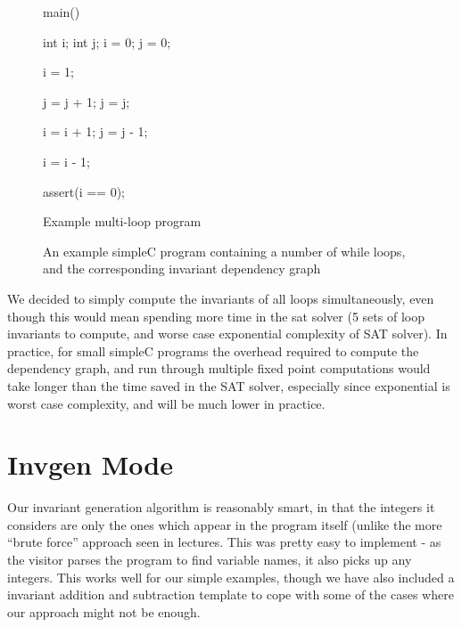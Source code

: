 \documentclass[11pt]{article}
\begin{document}
\begin{figure}[H]
\begin{center}
  \begin{minipage}[b]{.4\textwidth}
    \begin{algorithm}[H]
    main() {

    int i;
    int j;
    i = 0;
    j = 0;

     {
        i = 1;
    }

    {
       {
            j = j + 1;
        }
        j = j;

         {
            i = i + 1;
            j = j - 1;
        }
    }

     {
        i = i - 1;
    }

    assert(i == 0);
    }
    \caption{Example multi-loop program}
    \end{algorithm}
  \end{minipage}
  \quad \quad \quad \quad \quad \quad \quad \quad
  \begin{minipage}[H]{.3\textwidth}
    
  \end{minipage}
\end{center}
\caption{An example simpleC program containing a number of while loops, and the corresponding invariant dependency graph}
\end{figure}

We decided to simply compute the invariants of all loops simultaneously, even though this would mean spending more time in the sat solver (5 sets of loop invariants to compute, and worse case exponential complexity of SAT solver). In practice, for small simpleC programs the overhead required to compute the dependency graph, and run through multiple fixed point computations would take longer than the time saved in the SAT solver, especially since exponential is worst case complexity, and will be much lower in practice. \\

\section{Invgen Mode}

Our invariant generation algorithm is reasonably smart, in that the integers it considers are only the ones which appear in the program itself (unlike the more ``brute force'' approach seen in lectures. This was pretty easy to implement - as the visitor parses the program to find variable names, it also picks up any integers. This works well for our simple examples, though we have also included a invariant addition and subtraction template to cope with some of the cases where our approach might not be enough. \\
\end{document}
